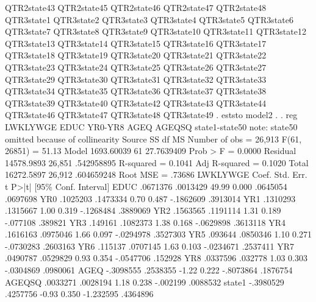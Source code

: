                QTR2state43 QTR2state45 QTR2state46 QTR2state47 QTR2state48
               QTR3state1 QTR3state2 QTR3state3 QTR3state4 QTR3state5
               QTR3state6 QTR3state7 QTR3state8 QTR3state9 QTR3state10
               QTR3state11 QTR3state12 QTR3state13 QTR3state14 QTR3state15
               QTR3state16 QTR3state17 QTR3state18 QTR3state19 QTR3state20
               QTR3state21 QTR3state22 QTR3state23 QTR3state24 QTR3state25
               QTR3state26 QTR3state27 QTR3state29 QTR3state30 QTR3state31
               QTR3state32 QTR3state33 QTR3state34 QTR3state35 QTR3state36
               QTR3state37 QTR3state38 QTR3state39 QTR3state40 QTR3state42
               QTR3state43 QTR3state44 QTR3state46 QTR3state47 QTR3state48
               QTR3state49
{\smallskip}
. eststo model2
{\smallskip}
. 
. reg  LWKLYWGE EDUC YR0-YR8 AGEQ AGEQSQ state1-state50
note: state50 omitted because of collinearity
{\smallskip}
      Source {\VBAR}       SS           df       MS      Number of obs   =    26,913
   F(61, 26851)    =     51.13
       Model {\VBAR}  1693.60039        61  27.7639409   Prob > F        =    0.0000
    Residual {\VBAR}  14578.9893    26,851  .542958895   R-squared       =    0.1041
   Adj R-squared   =    0.1020
       Total {\VBAR}  16272.5897    26,912  .604659248   Root MSE        =    .73686
{\smallskip}
    LWKLYWGE {\VBAR}      Coef.   Std. Err.      t    P>|t|     [95\% Conf. Interval]
        EDUC {\VBAR}   .0671376   .0013429    49.99   0.000     .0645054    .0697698
         YR0 {\VBAR}   .1025203   .1473334     0.70   0.487    -.1862609    .3913014
         YR1 {\VBAR}   .1310293   .1315667     1.00   0.319    -.1268484    .3889069
         YR2 {\VBAR}   .1563565   .1191114     1.31   0.189     -.077108     .389821
         YR3 {\VBAR}    .149161   .1082373     1.38   0.168    -.0629898    .3613118
         YR4 {\VBAR}   .1616163   .0975046     1.66   0.097    -.0294978    .3527303
         YR5 {\VBAR}    .093644   .0850346     1.10   0.271    -.0730283    .2603163
         YR6 {\VBAR}    .115137   .0707145     1.63   0.103    -.0234671    .2537411
         YR7 {\VBAR}   .0490787   .0529829     0.93   0.354    -.0547706     .152928
         YR8 {\VBAR}   .0337596    .032778     1.03   0.303    -.0304869    .0980061
        AGEQ {\VBAR}  -.3098555   .2538355    -1.22   0.222    -.8073864    .1876754
      AGEQSQ {\VBAR}   .0033271   .0028194     1.18   0.238     -.002199    .0088532
      state1 {\VBAR}  -.3980529   .4257756    -0.93   0.350    -1.232595    .4364896
